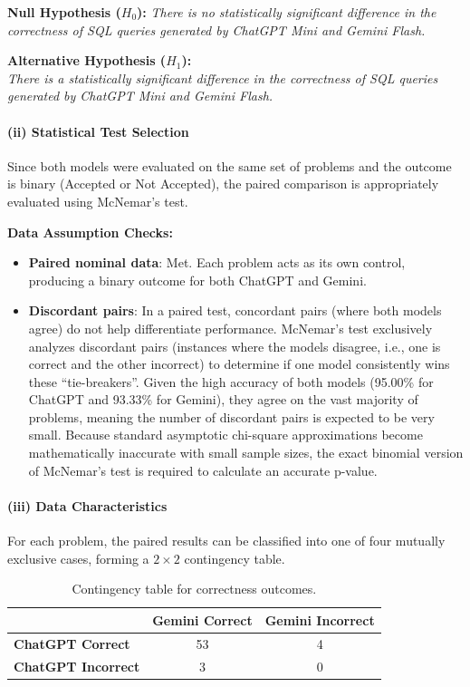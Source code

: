 \documentclass[11pt,a4paper]{article}
\begin{document}
    \textbf{Null Hypothesis ($H_0$):}
    \textit{There is no statistically significant difference in the correctness of SQL queries generated by ChatGPT Mini and Gemini Flash.}

    \textbf{Alternative Hypothesis ($H_1$):} \\
    \textit{There is a statistically significant difference in the correctness of SQL queries generated by ChatGPT Mini and Gemini Flash.}

    \paragraph{(ii) Statistical Test Selection}
    \quad

    Since both models were evaluated on the same set of problems and the outcome is binary (Accepted or Not Accepted), the paired comparison is appropriately evaluated using McNemar's test. 

    \textbf{Data Assumption Checks:}
    \begin{itemize}
        \item \textbf{Paired nominal data}: Met. Each problem acts as its own control, producing a binary outcome for both ChatGPT and Gemini.
        \item \textbf{Discordant pairs}: In a paired test, concordant pairs (where both models agree) do not help differentiate performance. McNemar's test exclusively analyzes discordant pairs (instances where the models disagree, i.e., one is correct and the other incorrect) to determine if one model consistently wins these ``tie-breakers''. Given the high accuracy of both models (95.00\% for ChatGPT and 93.33\% for Gemini), they agree on the vast majority of problems, meaning the number of discordant pairs is expected to be very small. Because standard asymptotic chi-square approximations become mathematically inaccurate with small sample sizes, the exact binomial version of McNemar's test is required to calculate an accurate p-value.
    \end{itemize}

    \paragraph{(iii) Data Characteristics}
    \quad

    For each problem, the paired results can be classified into one of four mutually exclusive cases, forming a $2 \times 2$ contingency table.

    \begin{table}[htbp]
    \centering
    \begin{tabular}{lcc}
    \hline
     & \textbf{Gemini Correct} & \textbf{Gemini Incorrect} \\
    \hline
    \textbf{ChatGPT Correct}   & 53 & 4 \\
    \textbf{ChatGPT Incorrect} & 3  & 0 \\
    \hline
    \end{tabular}
    \caption{Contingency table for correctness outcomes.}
    \label{tab:contingency-correctness}
    \end{table}
\end{document}
